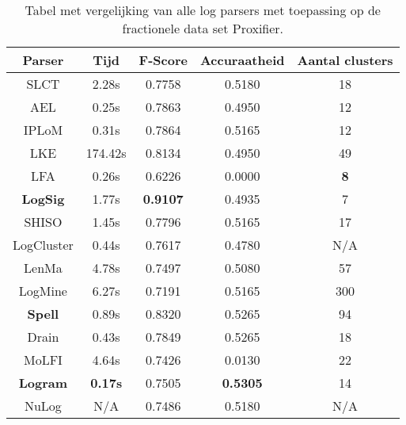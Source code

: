 \begin{table}[!htp]
    \caption{Tabel met vergelijking van alle log parsers met toepassing op de fractionele data set Proxifier.}
    \label{table:Proxifier}
    \begin{center}
        \begin{tabular}{||c | c | c | c | c||} 
            \hline
            Parser & Tijd & F-Score & Accuraatheid & Aantal clusters \\ [0.5ex] 
            \hline\hline
            SLCT & 2.28s & 0.7758 & 0.5180 & 18 \\
            
            AEL & 0.25s & 0.7863 & 0.4950 & 12 \\ 
            
            IPLoM & 0.31s & 0.7864 & 0.5165 & 12 \\
            
            LKE & 174.42s & 0.8134 & 0.4950 & 49 \\
            
            LFA & 0.26s & 0.6226 & 0.0000 & \textbf{8}  \\
            
            \textbf{LogSig} & 1.77s & \textbf{0.9107} & 0.4935 & 7 \\
            
            SHISO & 1.45s & 0.7796 & 0.5165 & 17 \\
            
            LogCluster & 0.44s & 0.7617 & 0.4780 & N/A \\
            
            LenMa & 4.78s & 0.7497 & 0.5080 & 57 \\
            
            LogMine & 6.27s & 0.7191 & 0.5165 & 300 \\
            
            \textbf{Spell} & 0.89s & 0.8320 & 0.5265 & 94 \\
            
            Drain & 0.43s & 0.7849 & 0.5265 & 18 \\
            
            MoLFI & 4.64s & 0.7426 & 0.0130 & 22 \\
            
            \textbf{Logram} & \textbf{0.17s} & 0.7505 & \textbf{0.5305} & 14 \\
            
            NuLog & N/A & 0.7486 & 0.5180 & N/A \\
            \hline
        \end{tabular}
    \end{center}
\end{table}


